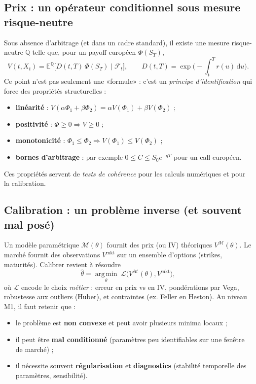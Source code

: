 \documentclass[11pt,a4paper]{report}
\theoremstyle{definition}
\theoremstyle{plain}
\theoremstyle{remark}
\newcommand{\dd}{\mathrm{d}}
\newcommand{\E}{\mathbb{E}}
\newcommand{\1}{\mathbf{1}}
\newcommand{\Qmeas}{\mathbb{Q}}
\newcommand{\F}{\mathcal{F}}
\newcommand{\argmin}{\operatorname*{arg\,min}}
\begin{document}
\subsection*{Prix : un opérateur conditionnel sous mesure risque-neutre}
Sous absence d'arbitrage (et dans un cadre standard), il existe une mesure risque-neutre $\Qmeas$ telle que, pour un payoff européen $\Phi(S_T)$,
\[
V(t,X_t)=\E^{\Qmeas}\big[D(t,T)\,\Phi(S_T)\mid \F_t\big],
\qquad D(t,T)=\exp\Big(-\int_t^T r(u)\,\dd u\Big).
\]
Ce point n'est pas seulement une «formule» : c'est un \emph{principe d'identification} qui force des propriétés structurelles :
\begin{itemize}[leftmargin=*]
\item \textbf{linéarité} : $V(\alpha\Phi_1+\beta\Phi_2)=\alpha V(\Phi_1)+\beta V(\Phi_2)$ ;
\item \textbf{positivité} : $\Phi\ge 0 \Rightarrow V\ge 0$ ;
\item \textbf{monotonicité} : $\Phi_1\le \Phi_2 \Rightarrow V(\Phi_1)\le V(\Phi_2)$ ;
\item \textbf{bornes d'arbitrage} : par exemple $0\le C\le S_0e^{-qT}$ pour un call européen.
\end{itemize}
Ces propriétés servent de \emph{tests de cohérence} pour les calculs numériques et pour la calibration.

\subsection*{Calibration : un problème inverse (et souvent mal posé)}
Un modèle paramétrique $\mathcal{M}(\theta)$ fournit des prix (ou IV) théoriques $V^{\mathcal{M}}(\theta)$.
Le marché fournit des observations $V^{\text{mkt}}$ sur un ensemble d'options (strikes, maturités).
Calibrer revient à résoudre
\[
\hat\theta=\argmin_\theta\ \mathcal{L}\big(V^{\mathcal{M}}(\theta),V^{\text{mkt}}\big),
\]
où $\mathcal{L}$ encode le choix \emph{métier} : erreur en prix vs en IV, pondérations par Vega, robustesse aux outliers (Huber), et contraintes (ex. Feller en Heston).
Au niveau M1, il faut retenir que :
\begin{itemize}[leftmargin=*]
\item le problème est \textbf{non convexe} et peut avoir plusieurs minima locaux ;
\item il peut être \textbf{mal conditionné} (paramètres peu identifiables sur une fenêtre de marché) ;
\item il nécessite souvent \textbf{régularisation} et \textbf{diagnostics} (stabilité temporelle des paramètres, sensibilité).
\end{itemize}
\end{document}
